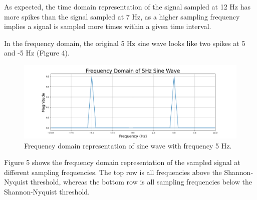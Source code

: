 \documentclass{article}
\begin{document}

    
    

As expected, the time domain representation of the signal sampled at 12 Hz has more spikes than the signal sampled at 7 Hz, as a higher sampling frequency implies a signal is sampled more times within a given time interval.

In the frequency domain, the original 5 Hz sine wave looks like two spikes at 5 and -5 Hz (Figure 4).
\begin{figure}[H]
    \includegraphics[width=\linewidth]{images/freqdomain_5hz.png}
    \caption{Frequency domain representation of sine wave with frequency 5 Hz.}
    \label{fig:enter-label}
\end{figure}

Figure 5 shows the frequency domain representation of the sampled signal at different sampling frequencies. 
The top row is all frequencies above the Shannon-Nyquist threshold, whereas the bottom row is all sampling frequencies below the Shannon-Nyquist threshold.
\end{document}
